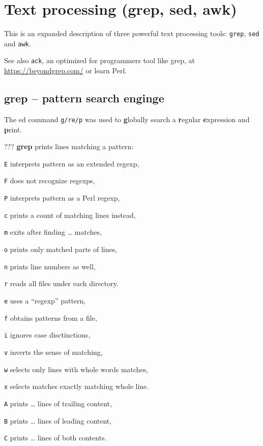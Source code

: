 \section{Text processing (grep, sed, awk)}
This is an expanded description of three powerful text processing tools:
\texttt{grep}, \texttt{sed} and \texttt{awk}.

See also \texttt{ack}, an optimized for programmers tool like grep, at \url{https://beyondgrep.com/} or learn Perl.

\subsection{grep -- pattern search enginge}
The ed command \texttt{g/re/p} was used to \textbf{g}lobally search a \textbf{r}egular \textbf{e}xpression and \textbf{p}rint.
\begin{compactenum}
\item [???] \textbf{grep} prints lines matching a pattern:
\item [\texttt{E}] interprets pattern as an extended regexp,
\item [\texttt{F}] does not recognize regexps,
\item [\texttt{P}] interprets pattern as a Perl regexp,
\item []
\item [\texttt{c}] prints a count of matching lines instead,
\item [\texttt{m}] exits after finding \ldots{} matches,
\item [\texttt{o}] prints only matched parts of lines,
\item [\texttt{n}] prints line numbers as well,
\item [\texttt{r}] reads all files under each directory.
\item []
\item [\texttt{e}] uses a ``regexp'' pattern,
\item [\texttt{f}] obtains patterns from a file,
\item [\texttt{i}] ignores case disctinctions,
\item [\texttt{v}] inverts the sense of matching,
\item [\texttt{w}] selects only lines with whole words matches,
\item [\texttt{x}] selects matches exactly matching whole line.
\item []
\item [\texttt{A}] prints \ldots{} lines of trailing content,
\item [\texttt{B}] prints \ldots{} lines of leading content,
\item [\texttt{C}] prints \ldots{} lines of both contents.
\end{compactenum}

